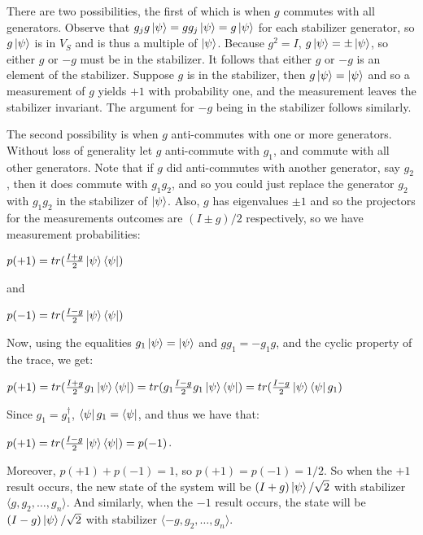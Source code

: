 \documentclass[12pt]{dalthesis}
\begin{document}
There are two possibilities, the first of which is when $g$ commutes with all generators. Observe that $g_jg\ket{\psi} = gg_j\ket{\psi} = g\ket{\psi}$ for each stabilizer generator, so $g\ket{\psi}$ is in $V_S$ and is thus a multiple of $\ket{\psi}$. Because $g^2 = I$, $g\ket{\psi} = \pm\ket{\psi}$, so either $g$ or $-g$ must be in the stabilizer. It follows that either $g$ or $-g$ is an element of the stabilizer. Suppose $g$ is in the stabilizer, then $g\ket{\psi} = \ket{\psi}$ and so a measurement of $g$ yields $+1$ with probability one, and the measurement leaves the stabilizer invariant. The argument for $-g$ being in the stabilizer follows similarly.

The second possibility is when $g$ anti-commutes with one or more generators. Without loss of generality let $g$ anti-commute with $g_1$, and commute with all other generators. Note that if $g$ did anti-commutes with another generator, say $g_2$, then it does commute with $g_1g_2$, and so you could just replace the generator $g_2$ with $g_1g_2$ in the stabilizer of $\ket{\psi}$. Also, $g$ has eigenvalues $\pm 1$ and so the projectors for the measurements outcomes are $(I \pm g)/2$ respectively, so we have measurement probabilities:
\begin{center}
$p(+1) = tr(\frac{I+g}{2}\ket{\psi}\bra{\psi})$
\end{center}
and 
\begin{center}
$p(-1) = tr(\frac{I-g}{2}\ket{\psi}\bra{\psi})$
\end{center}
Now, using the equalities $g_1\ket{\psi} = \ket{\psi}$ and $gg_1 = -g_1g$, and the cyclic property of the trace, we get:
\begin{center}
$p(+1) = tr(\frac{I+g}{2}g_1\ket{\psi}\bra{\psi}) = tr(g_1\frac{I-g}{2}g_1\ket{\psi}\bra{\psi}) = tr(\frac{I-g}{2}\ket{\psi}\bra{\psi}g_1)$
\end{center}
Since $g_1 = g_1^{\dag}$, $\bra{\psi}g_1 = \bra{\psi}$, and thus we have that:
\begin{center}
$p(+1) = tr(\frac{I-g}{2}\ket{\psi}\bra{\psi}) = p(-1)$.
\end{center}
Moreover, $p(+1) + p(-1) = 1$, so $p(+1) = p(-1) = 1/2$. So when the $+1$ result occurs, the new state of the system will be $(I + g)\ket{\psi}/\sqrt{2}$ with stabilizer $\langle g, g_2, \dots , g_n \rangle$. And similarly, when the $-1$ result occurs, the state will be $(I - g)\ket{\psi}/\sqrt{2}$ with stabilizer $\langle -g, g_2, \dots , g_n \rangle$.
\end{document}
